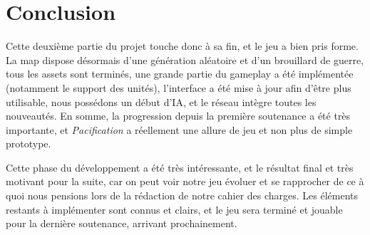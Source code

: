 \documentclass[12pt]{report}
\begin{document}
\chapter{Conclusion}

Cette deuxième partie du projet touche donc à sa fin, et le jeu a bien pris
forme. La map dispose désormais d’une génération aléatoire et d’un brouillard de
guerre, tous les assets sont terminés, une grande partie du gameplay a été
implémentée (notamment le support des unités), l’interface a été mise à jour
afin d’être plus utilisable, nous possédons un début d’IA, et le réseau intègre
toutes les nouveautés. En somme, la progression depuis la première soutenance a
été très importante, et \textit{Pacification} a réellement une allure de jeu et
non plus de simple prototype.

Cette phase du développement a été très intéressante, et le résultat final et
très motivant pour la suite, car on peut voir notre jeu évoluer et se rapprocher
de ce à quoi nous pensions lors de la rédaction de notre cahier des charges. Les
éléments restants à implémenter sont connus et clairs, et le jeu sera terminé et
jouable pour la dernière soutenance, arrivant prochainement.
\end{document}
